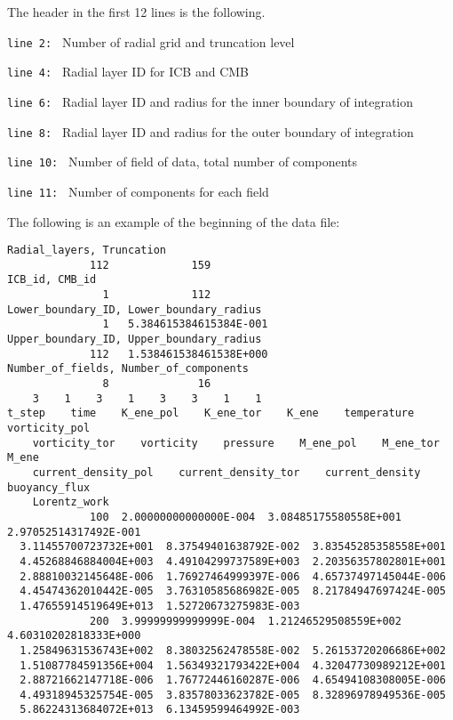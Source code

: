The header in the first 12 lines is the following. 
%
\begin{description}
\item{\tt  line 2: } Number of radial grid and truncation level
\item{\tt  line 4: } Radial layer ID for ICB and CMB
\item{\tt  line 6: } Radial layer ID and radius for the inner boundary of integration
\item{\tt  line 8: } Radial layer ID and radius for the outer boundary of integration
\item{\tt  line 10: } Number of field of data, total number of components
\item{\tt  line 11: } Number of components for each field
\end{description}
%
The following is an example of the beginning of the data file:
{\scriptsize
\begin{verbatim}
Radial_layers, Truncation
             112             159
ICB_id, CMB_id
               1             112
Lower_boundary_ID, Lower_boundary_radius
               1   5.384615384615384E-001
Upper_boundary_ID, Upper_boundary_radius
             112   1.538461538461538E+000
Number_of_fields, Number_of_components
               8              16
    3    1    3    1    3    3    1    1
t_step    time    K_ene_pol    K_ene_tor    K_ene    temperature    vorticity_pol
    vorticity_tor    vorticity    pressure    M_ene_pol    M_ene_tor    M_ene
    current_density_pol    current_density_tor    current_density    buoyancy_flux    
    Lorentz_work    
             100  2.00000000000000E-004  3.08485175580558E+001  2.97052514317492E-001
  3.11455700723732E+001  8.37549401638792E-002  3.83545285358558E+001  
  4.45268846884004E+003  4.49104299737589E+003  2.20356357802801E+001  
  2.88810032145648E-006  1.76927464999397E-006  4.65737497145044E-006  
  4.45474362010442E-005  3.76310585686982E-005  8.21784947697424E-005  
  1.47655914519649E+013  1.52720673275983E-003
             200  3.99999999999999E-004  1.21246529508559E+002  4.60310202818333E+000  
  1.25849631536743E+002  8.38032562478558E-002  5.26153720206686E+002  
  1.51087784591356E+004  1.56349321793422E+004  4.32047730989212E+001  
  2.88721662147718E-006  1.76772446160287E-006  4.65494108308005E-006  
  4.49318945325754E-005  3.83578033623782E-005  8.32896978949536E-005  
  5.86224313684072E+013  6.13459599464992E-003
\end{verbatim}
}
%
